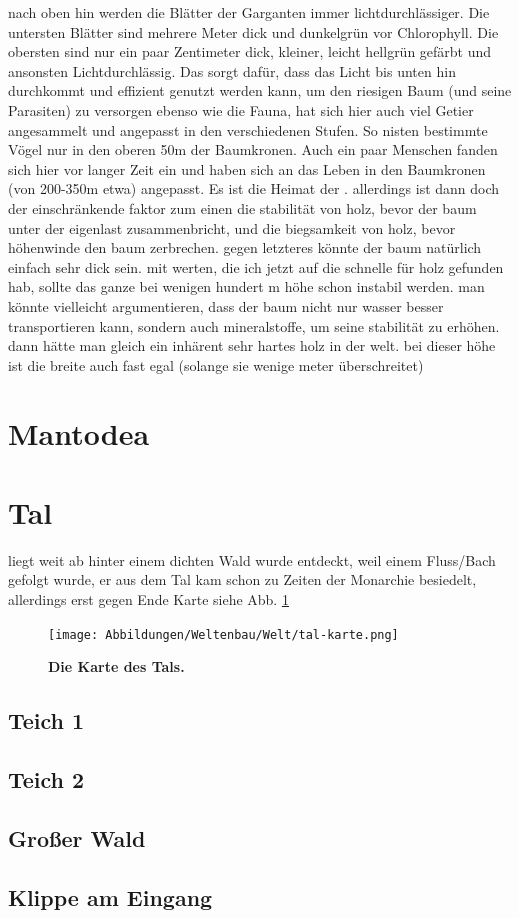 \begin{outline}
	\1 nach oben hin werden die Blätter der Garganten immer lichtdurchlässiger. Die untersten Blätter sind mehrere Meter dick und dunkelgrün vor Chlorophyll. Die obersten sind nur ein paar Zentimeter dick, kleiner, leicht hellgrün gefärbt und ansonsten Lichtdurchlässig. Das sorgt dafür, dass das Licht bis unten hin durchkommt und effizient genutzt werden kann, um den riesigen Baum (und seine Parasiten) zu versorgen
	\1 ebenso wie die Fauna, hat sich hier auch viel Getier angesammelt und angepasst in den verschiedenen Stufen. So nisten bestimmte Vögel nur in den oberen 50m der Baumkronen. Auch ein paar Menschen fanden sich hier vor langer Zeit ein und haben sich an das Leben in den Baumkronen (von 200-350m etwa) angepasst. Es ist die Heimat der .
	\1 allerdings ist dann doch der einschränkende faktor zum einen die stabilität von holz, bevor der baum unter der eigenlast zusammenbricht, und die biegsamkeit von holz, bevor höhenwinde den baum zerbrechen. gegen letzteres könnte der baum natürlich einfach sehr dick sein. mit werten, die ich jetzt auf die schnelle für holz gefunden hab, sollte das ganze bei wenigen hundert m höhe schon instabil werden. man könnte vielleicht argumentieren, dass der baum nicht nur wasser besser transportieren kann, sondern auch mineralstoffe, um seine stabilität zu erhöhen. dann hätte man gleich ein inhärent sehr hartes holz in der welt. bei dieser höhe ist die breite auch fast egal (solange sie wenige meter überschreitet)
\end{outline}

\section{Mantodea} \label{sec:land}

\section{Tal}
\begin{outline}
	\1 liegt weit ab hinter einem dichten Wald
	\1 wurde entdeckt, weil einem Fluss/Bach gefolgt wurde, er aus dem Tal kam
	\1 schon zu Zeiten der Monarchie besiedelt, allerdings erst gegen Ende
	\1 Karte siehe Abb. \ref{fig:tal-karte}
\end{outline}

\begin{figure}[tbh]
	\centering
	\texttt{[image: Abbildungen/Weltenbau/Welt/tal-karte.png]}
	\caption[Karte des Tals]{\textbf{Die Karte des Tals.}}
	\label{fig:tal-karte}
\end{figure}

\subsection{Teich 1}
\subsection{Teich 2}
\subsection{Großer Wald}
\subsection{Klippe am Eingang}

